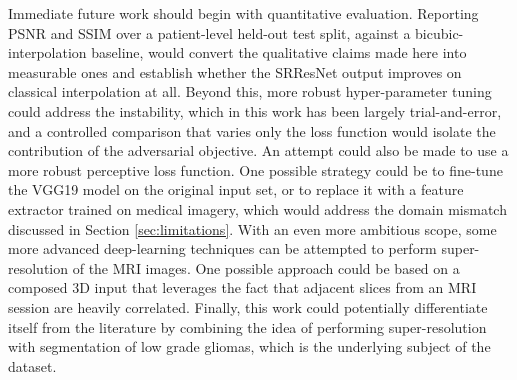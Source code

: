 \documentclass[conference]{IEEEtran}
\begin{document}
Immediate future work should begin with quantitative evaluation. Reporting PSNR and SSIM over a patient-level held-out test split, against a bicubic-interpolation baseline, would convert the qualitative claims made here into measurable ones and establish whether the SRResNet output improves on classical interpolation at all. Beyond this, more robust hyper-parameter tuning could address the instability, which in this work has been largely trial-and-error, and a controlled comparison that varies only the loss function would isolate the contribution of the adversarial objective. An attempt could also be made to use a more robust perceptive loss function. One possible strategy could be to fine-tune the VGG19 model on the original input set, or to replace it with a feature extractor trained on medical imagery, which would address the domain mismatch discussed in Section \ref{sec:limitations}. With an even more ambitious scope, some more advanced deep-learning techniques can be attempted to perform super-resolution of the MRI images. One possible approach could be based on a composed 3D input that leverages the fact that adjacent slices from an MRI session are heavily correlated. Finally, this work could potentially differentiate itself from the literature by combining the idea of performing super-resolution with segmentation of low grade gliomas, which is the underlying subject of the dataset.



\end{document}
